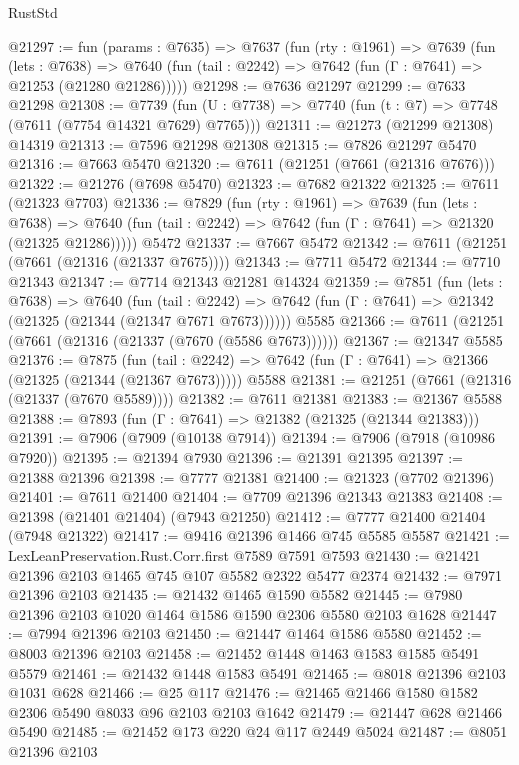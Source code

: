\begin{lexlean}{RustStd}
\begin{coremodule}
{\begin{coremodule}
{{{{{{{{{{{{{{{{{{{{{{{{{{{{{{{{{{@21297 := fun (params : @7635) =>
  @7637
    (fun (rty : @1961) =>
    @7639
      (fun (lets : @7638) =>
      @7640 (fun (tail : @2242) => @7642 (fun (Γ : @7641) => @21253 (@21280 @21286)))))
@21298 := @7636 @21297
@21299 := @7633 @21298
@21308 := @7739
    (fun (U : @7738) => @7740 (fun (t : @7) => @7748 (@7611 (@7754 @14321 @7629) @7765)))
@21311 := @21273 (@21299 @21308) @14319
@21313 := @7596 @21298 @21308
@21315 := @7826 @21297 @5470
@21316 := @7663 @5470
@21320 := @7611 (@21251 (@7661 (@21316 @7676)))
@21322 := @21276 (@7698 @5470)
@21323 := @7682 @21322
@21325 := @7611 (@21323 @7703)
@21336 := @7829
    (fun (rty : @1961) =>
    @7639
      (fun (lets : @7638) =>
      @7640 (fun (tail : @2242) => @7642 (fun (Γ : @7641) => @21320 (@21325 @21286)))))
    @5472
@21337 := @7667 @5472
@21342 := @7611 (@21251 (@7661 (@21316 (@21337 @7675))))
@21343 := @7711 @5472
@21344 := @7710 @21343
@21347 := @7714 @21343 @21281 @14324
@21359 := @7851
    (fun (lets : @7638) =>
    @7640
      (fun (tail : @2242) =>
      @7642 (fun (Γ : @7641) => @21342 (@21325 (@21344 (@21347 @7671 @7673))))))
    @5585
@21366 := @7611 (@21251 (@7661 (@21316 (@21337 (@7670 (@5586 @7673))))))
@21367 := @21347 @5585
@21376 := @7875
    (fun (tail : @2242) => @7642 (fun (Γ : @7641) => @21366 (@21325 (@21344 (@21367 @7673)))))
    @5588
@21381 := @21251 (@7661 (@21316 (@21337 (@7670 @5589))))
@21382 := @7611 @21381
@21383 := @21367 @5588
@21388 := @7893 (fun (Γ : @7641) => @21382 (@21325 (@21344 @21383)))
@21391 := @7906 (@7909 (@10138 @7914))
@21394 := @7906 (@7918 (@10986 @7920))
@21395 := @21394 @7930
@21396 := @21391 @21395
@21397 := @21388 @21396
@21398 := @7777 @21381
@21400 := @21323 (@7702 @21396)
@21401 := @7611 @21400
@21404 := @7709 @21396 @21343 @21383
@21408 := @21398 (@21401 @21404) (@7943 @21250)
@21412 := @7777 @21400 @21404 (@7948 @21322)
@21417 := @9416 @21396 @1466 @745 @5585 @5587
@21421 := LexLeanPreservation.Rust.Corr.first @7589 @7591 @7593
@21430 := @21421 @21396 @2103 @1465 @745 @107 @5582 @2322 @5477 @2374
@21432 := @7971 @21396 @2103
@21435 := @21432 @1465 @1590 @5582
@21445 := @7980 @21396 @2103 @1020 @1464 @1586 @1590 @2306 @5580 @2103 @1628
@21447 := @7994 @21396 @2103
@21450 := @21447 @1464 @1586 @5580
@21452 := @8003 @21396 @2103
@21458 := @21452 @1448 @1463 @1583 @1585 @5491 @5579
@21461 := @21432 @1448 @1583 @5491
@21465 := @8018 @21396 @2103 @1031 @628
@21466 := @25 @117
@21476 := @21465 @21466 @1580 @1582 @2306 @5490 @8033 @96 @2103 @2103 @1642
@21479 := @21447 @628 @21466 @5490
@21485 := @21452 @173 @220 @24 @117 @2449 @5024
@21487 := @8051 @21396 @2103
}}}}}}}}}}}}}}}}}}}}}}}}}}}}}}}}}}
\end{coremodule}}
\end{coremodule}
\end{lexlean}
